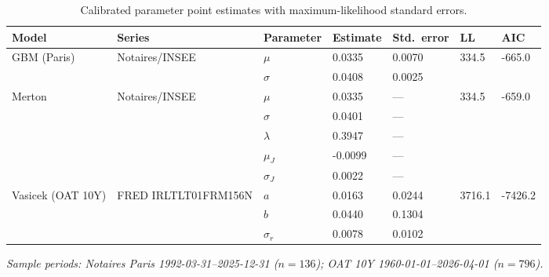 
\begin{table}[ht]
\centering
\caption{Calibrated parameter point estimates with maximum-likelihood standard errors.}
\label{tab:calibration}
\small
\begin{tabular}{lllllll}
\toprule
Model & Series & Parameter & Estimate & Std.\ error & LL & AIC \\
\midrule
GBM (Paris)        & Notaires/INSEE & $\mu$        & 0.0335 & 0.0070    & \multirow{2}{*}{334.5} & \multirow{2}{*}{-665.0} \\
                   &                & $\sigma$     & 0.0408 & 0.0025 & & \\
\midrule
Merton             & Notaires/INSEE & $\mu$        & 0.0335 &     ---     & \multirow{5}{*}{334.5} & \multirow{5}{*}{-659.0} \\
                   &                & $\sigma$     & 0.0401 &     ---     & & \\
                   &                & $\lambda$    & 0.3947 &     ---     & & \\
                   &                & $\mu_J$      & -0.0099 &     ---     & & \\
                   &                & $\sigma_J$   & 0.0022 &     ---     & & \\
\midrule
Vasicek (OAT 10Y)  & FRED IRLTLT01FRM156N & $a$    & 0.0163 & 0.0244    & \multirow{3}{*}{3716.1} & \multirow{3}{*}{-7426.2} \\
                   &                      & $b$    & 0.0440 & 0.1304 & & \\
                   &                      & $\sigma_r$ & 0.0078 & 0.0102 & & \\
\bottomrule
\end{tabular}
\par\vspace{0.4em}\footnotesize\textit{Sample periods:
Notaires Paris 1992-03-31--2025-12-31 ($n=136$);
OAT 10Y 1960-01-01--2026-04-01 ($n=796$).}
\end{table}
